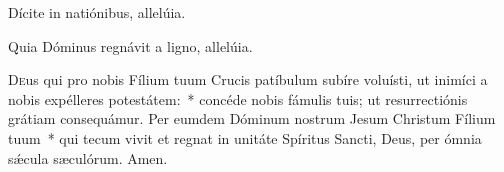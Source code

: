\vv Dícite in natiónibus, allelúia.

\rr Quia Dóminus regnávit a ligno, allelúia.


\lettrine{D}{e}us qui pro nobis Fílium tuum Crucis patíbulum subíre voluísti, ut inimíci a nobis expélleres potestátem:~* concéde nobis fámulis tuis; ut resurrectiónis grátiam consequámur. Per eumdem Dóminum nostrum Jesum Christum Fílium tuum~* qui tecum vivit et regnat in unitáte Spíritus Sancti, Deus, per ómnia sǽcula sæculórum. \rr Amen.